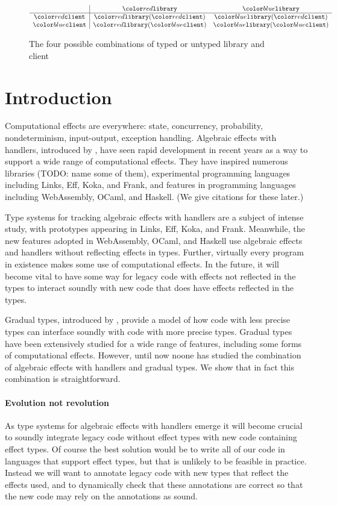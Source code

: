 \begin{figure}
$$
\begin{array}{c|cc}
  & \dhandler & \shandler \\
  \hline
  \dclient & \dhandler(\dclient) & \shandler(\dclient) \\
  \sclient & \dhandler(\sclient) & \shandler(\sclient)
\end{array}
$$
\caption{The four possible combinations of typed or untyped library and client}
\label{fig:migration-example}
\end{figure}

\section{Introduction}

Computational effects are everywhere: state, concurrency, probability,
nondeterminism, input-output, exception handling. Algebraic effects with handlers,
introduced by \citet{plotkin-pretnar-2009},
have seen rapid development in recent years as a way to support a wide range
of computational effects. They have inspired numerous libraries (TODO: name some of them), experimental
programming languages including Links, Eff, Koka, and Frank, and features
in programming languages including WebAssembly, OCaml, and Haskell.
(We give citations for these later.)

Type systems for tracking algebraic effects with handlers are a subject of intense study,
with prototypes appearing in Links, Eff, Koka, and Frank.
Meanwhile, the new features adopted in WebAssembly, OCaml, and Haskell
use algebraic effects and handlers without reflecting effects in types.
Further, virtually every program in existence makes some use of computational
effects. In the future, it will become vital to have some way for legacy
code with effects not reflected in the types to interact soundly with
new code that does have effects reflected in the types.

Gradual types, introduced by \citet{siek-taha-2006},
provide a model of how code with less precise types can interface soundly with
code with more precise types. Gradual types have been extensively studied for a wide
range of features, including some forms of computational effects. However,
until now noone has studied the combination of algebraic effects
with handlers and gradual types. We show that in fact this combination
is straightforward.

\paragraph{Evolution not revolution}
As type systems for algebraic effects with handlers emerge
it will become crucial to soundly integrate legacy code without effect types
with new code containing effect types. Of course the best solution would be
to write all of our code in languages that support effect types,
but that is unlikely to be feasible in practice.
Instead we will want to annotate legacy code with new types that reflect
the effects used, and to dynamically check that these annotations
are correct so that the new code may rely on the annotations as sound.


